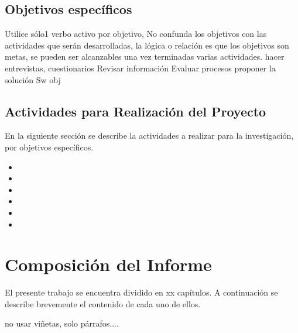 \subsection{Objetivos específicos}

Utilice sólo1 verbo activo por objetivo, No confunda los objetivos con las actividades que serán desarrolladas, la lógica o relación es que los objetivos son metas, se pueden ser alcanzables una vez terminadas varias actividades.
hacer entrevistas, cuestionarios
Revisar información 
Evaluar procesos
proponer la solución Sw obj

\subsection{Actividades para Realización del Proyecto}

En la siguiente sección se describe la actividades a realizar para la investigación, por objetivos específicos.
\begin{itemize}
    \item 
    \item 
    \item 
    \item 
    \item 
    \item 
    
\end{itemize}



\section{Composición del Informe} 

El presente trabajo se encuentra dividido en xx capítulos. A continuación se describe brevemente el contenido de cada uno de ellos.

no usar viñetas, solo párrafos....\\


